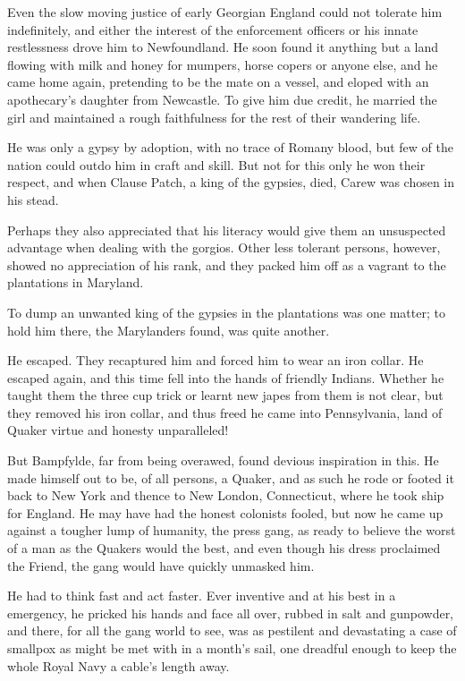 Even the slow moving justice of early Georgian England could not tolerate him indefinitely, and either the interest of the enforcement officers or his innate restlessness drove him to Newfoundland. He soon found it anything but a land flowing with milk and honey for mumpers, horse copers or anyone else, and he came home again, pretending to be the mate on a vessel, and eloped with an apothecary's daughter from Newcastle. To give him due credit, he married the girl and maintained a rough faithfulness for the rest of their wandering life.

\Flourish

He was only a gypsy by adoption, with no trace of Romany blood, but few of the nation could outdo him in craft and skill. But not for this only he won their respect, and when Clause Patch, a king of the gypsies, died, Carew was chosen in his stead.

Perhaps they also appreciated that his literacy would give them an unsuspected advantage when dealing with the gorgios. Other less tolerant persons, however, showed no appreciation of his rank, and they packed him off as a vagrant to the plantations in Maryland.

To dump an unwanted king of the gypsies in the plantations was one matter; to hold him there, the Marylanders found, was quite another.

He escaped. They recaptured him and forced him to wear an iron collar. He escaped again, and this time fell into the hands of friendly Indians. Whether he taught them the three cup trick or learnt new japes from them is not clear, but they removed his iron collar, and thus freed he came into Pennsylvania, land of Quaker virtue and honesty unparalleled!

But Bampfylde, far from being overawed, found devious inspiration in this. He made himself out to be, of all persons, a Quaker, and as such he rode or footed it back to New York and thence to New London, Connecticut, where he took ship for England.
 He may have had the honest colonists fooled, but now he came up against a tougher lump of humanity, the press gang, as ready to believe the worst of a man as the Quakers would the best, and even though his dress proclaimed the Friend, the gang would have quickly unmasked him.

He had to think fast and act faster. Ever inventive and at his best in a emergency, he pricked his hands and face all over, rubbed in salt and gunpowder, and there, for all the gang world to see, was as pestilent and devastating a case of smallpox as might be met with in a month's sail, one dreadful enough to keep the whole Royal Navy a cable's length away.

